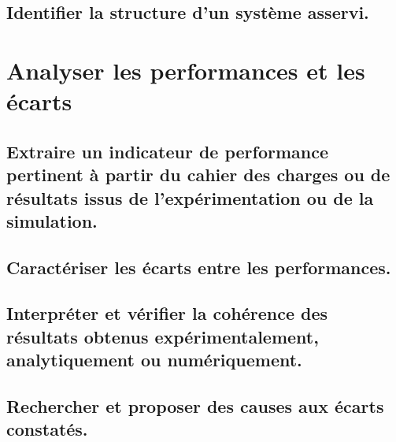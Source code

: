 \documentclass[10pt,fleqn]{article}
\begin{document}
\begin{multicols}{2} 

\end{multicols}

\subsection{Identifier la structure d'un système asservi.} 

\begin{multicols}{2} 

\end{multicols}

\section{Analyser les performances et les écarts} 

\subsection{Extraire un indicateur de performance pertinent à partir du cahier des charges ou de résultats issus de l'expérimentation ou de la simulation.} 

\begin{multicols}{2} 

\end{multicols}

\subsection{Caractériser les écarts entre les performances.} 

\begin{multicols}{2} 

\end{multicols}

\subsection{Interpréter et vérifier la cohérence des résultats obtenus expérimentalement, analytiquement ou numériquement. } 

\begin{multicols}{2} 

\end{multicols}

\subsection{Rechercher et proposer des causes aux écarts constatés.} 
\end{document}
